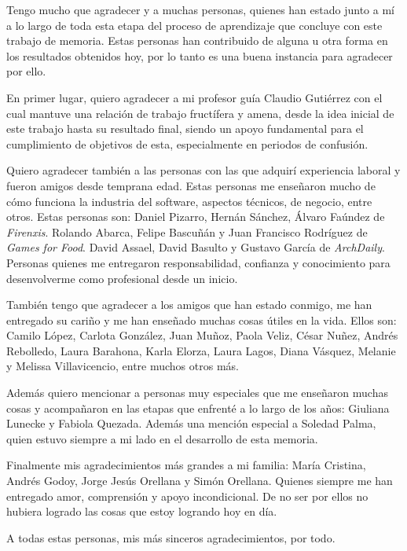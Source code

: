 \begin{thanks}
  Tengo mucho que agradecer y a muchas personas, quienes han estado junto a mí a lo largo de toda esta etapa del proceso de aprendizaje que concluye con este trabajo de memoria. Estas personas han contribuido de alguna u otra forma en los resultados obtenidos hoy, por lo tanto es una buena instancia para agradecer por ello.
  
  En primer lugar, quiero agradecer a mi profesor guía Claudio Gutiérrez con el cual mantuve una relación de trabajo fructífera y amena, desde la idea inicial de este trabajo hasta su resultado final, siendo un apoyo fundamental para el cumplimiento de objetivos de esta, especialmente en periodos de confusión.
  
  Quiero agradecer también a las personas con las que adquirí experiencia laboral y fueron amigos desde temprana edad. Estas personas me enseñaron mucho de cómo funciona la industria del software, aspectos técnicos, de negocio, entre otros. Estas personas son: Daniel Pizarro, Hernán Sánchez, Álvaro Faúndez de \emph{Firenxis}. Rolando Abarca, Felipe Bascuñán y Juan Francisco Rodríguez de \emph{Games for Food}. David Assael, David Basulto y Gustavo García de \emph{ArchDaily}. Personas quienes me entregaron responsabilidad, confianza y conocimiento para desenvolverme como profesional desde un inicio.
  
  También tengo que agradecer a los amigos que han estado conmigo, me han entregado su cariño y me han enseñado muchas cosas útiles en la vida. Ellos son: Camilo López, Carlota González, Juan Muñoz, Paola Veliz, César Nuñez, Andrés Rebolledo, Laura Barahona, Karla Elorza, Laura Lagos, Diana Vásquez, Melanie y Melissa Villavicencio, entre muchos otros más.
  
  Además quiero mencionar a personas muy especiales que me enseñaron muchas cosas y acompañaron en las etapas que enfrenté a lo largo de los años: Giuliana Lunecke y Fabiola Quezada. Además una mención especial a Soledad Palma, quien estuvo siempre a mi lado en el desarrollo de esta memoria.
  
  Finalmente mis agradecimientos más grandes a mi familia: María Cristina, Andrés Godoy, Jorge Jesús Orellana y Simón Orellana. Quienes siempre me han entregado amor, comprensión y apoyo incondicional. De no ser por ellos no hubiera logrado las cosas que estoy logrando hoy en día.
  
  A todas estas personas, mis más sinceros agradecimientos, por todo.
\end{thanks}